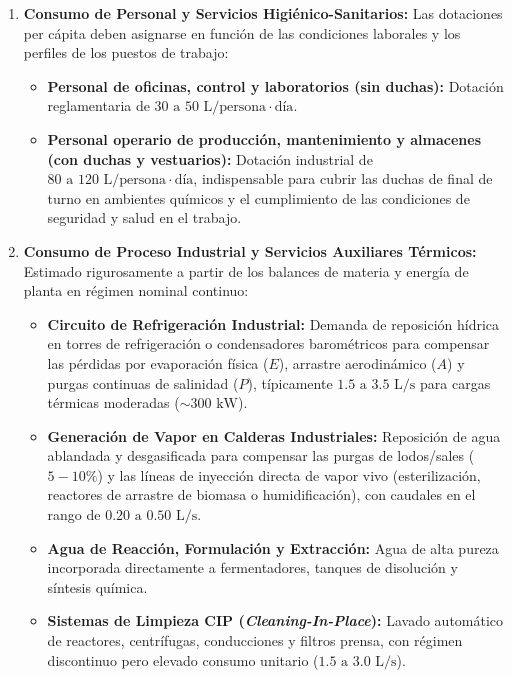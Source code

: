 \documentclass{report}
\begin{document}
\begin{enumerate}
    \item \textbf{Consumo de Personal y Servicios Higiénico-Sanitarios:}
          Las dotaciones per cápita deben asignarse en función de las condiciones laborales y los perfiles de los puestos de trabajo:
          \begin{itemize}
              \item \textbf{Personal de oficinas, control y laboratorios (sin duchas):} Dotación reglamentaria de $30\text{ a }50\text{ L/persona}\cdot\text{día}$.
              \item \textbf{Personal operario de producción, mantenimiento y almacenes (con duchas y vestuarios):} Dotación industrial de $80\text{ a }120\text{ L/persona}\cdot\text{día}$, indispensable para cubrir las duchas de final de turno en ambientes químicos y el cumplimiento de las condiciones de seguridad y salud en el trabajo.
          \end{itemize}

    \item \textbf{Consumo de Proceso Industrial y Servicios Auxiliares Térmicos:}
          Estimado rigurosamente a partir de los balances de materia y energía de planta en régimen nominal continuo:
          \begin{itemize}
              \item \textbf{Circuito de Refrigeración Industrial:} Demanda de reposición hídrica en torres de refrigeración o condensadores barométricos para compensar las pérdidas por evaporación física ($E$), arrastre aerodinámico ($A$) y purgas continuas de salinidad ($P$), típicamente $1.5\text{ a }3.5\text{ L/s}$ para cargas térmicas moderadas ($\sim 300\text{ kW}$).
              \item \textbf{Generación de Vapor en Calderas Industriales:} Reposición de agua ablandada y desgasificada para compensar las purgas de lodos/sales ($5-10\%$) y las líneas de inyección directa de vapor vivo (esterilización, reactores de arrastre de biomasa o humidificación), con caudales en el rango de $0.20\text{ a }0.50\text{ L/s}$.
              \item \textbf{Agua de Reacción, Formulación y Extracción:} Agua de alta pureza incorporada directamente a fermentadores, tanques de disolución y síntesis química.
              \item \textbf{Sistemas de Limpieza CIP (\textit{Cleaning-In-Place}):} Lavado automático de reactores, centrífugas, conducciones y filtros prensa, con régimen discontinuo pero elevado consumo unitario ($1.5\text{ a }3.0\text{ L/s}$).
          \end{itemize}


\end{enumerate}
\end{document}
